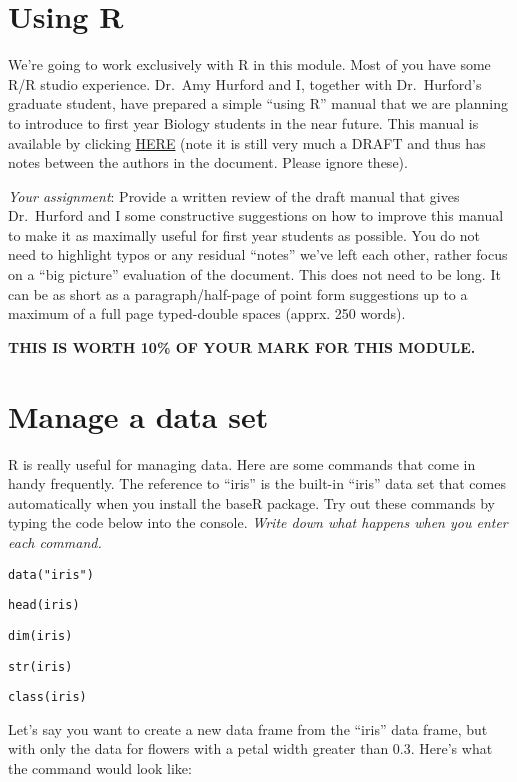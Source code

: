 \documentclass[]{book}
\begin{document}
\hypertarget{using-r}{%
\chapter{Using R}\label{using-r}}

We're going to work exclusively with R in this module. Most of you have some R/R studio experience. Dr.~Amy Hurford and I, together with Dr.~Hurford's graduate student, have prepared a simple ``using R'' manual that we are planning to introduce to first year Biology students in the near future. This manual is available by clicking \href{https://ahurford.github.io/quantitative-training-guide/}{HERE} (note it is still very much a DRAFT and thus has notes between the authors in the document. Please ignore these).

\emph{Your assignment}: Provide a written review of the draft manual that gives Dr.~Hurford and I some constructive suggestions on how to improve this manual to make it as maximally useful for first year students as possible. You do not need to highlight typos or any residual ``notes'' we've left each other, rather focus on a ``big picture'' evaluation of the document. This does not need to be long. It can be as short as a paragraph/half-page of point form suggestions up to a maximum of a full page typed-double spaces (apprx. 250 words).

\textbf{THIS IS WORTH 10\% OF YOUR MARK FOR THIS MODULE.}

\hypertarget{manage-a-data-set}{%
\chapter{Manage a data set}\label{manage-a-data-set}}

R is really useful for managing data. Here are some commands that come in handy frequently. The reference to ``iris'' is the built-in ``iris'' data set that comes automatically when you install the baseR package. Try out these commands by typing the code below into the console. \emph{Write down what happens when you enter each command.}

\texttt{data("iris")}

\texttt{head(iris)}

\texttt{dim(iris)}

\texttt{str(iris)}

\texttt{class(iris)}

Let's say you want to create a new data frame from the ``iris'' data frame, but with only the data for flowers with a petal width greater than 0.3. Here's what the command would look like:
\end{document}
